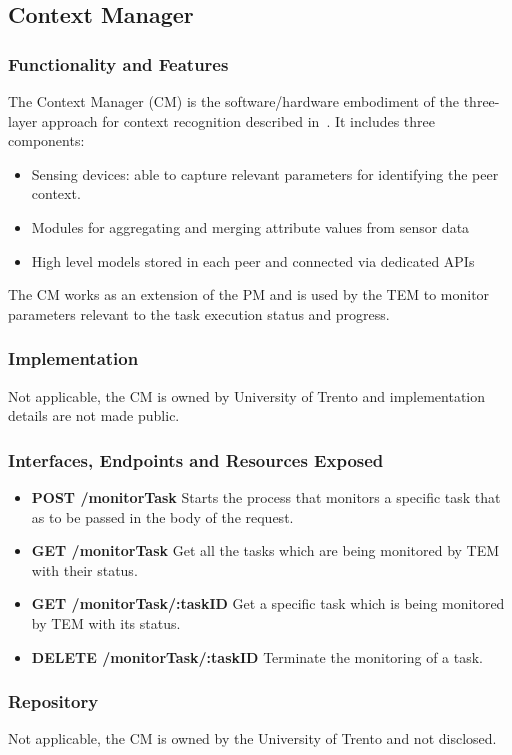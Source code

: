 \subsection{Context Manager}
\subsubsection{Functionality and Features}
The Context Manager (CM) is the software/hardware embodiment of the three-layer approach for context recognition described in~\cite{D4.3}. It includes three components:
\begin{itemize}
\item Sensing devices: able to capture relevant parameters for identifying the peer context.
\item Modules for aggregating and merging attribute values from sensor data 
\item High level models stored in each peer and connected via dedicated APIs
\end{itemize}
The CM works as an extension of the PM and is used by the TEM to monitor parameters relevant to the task execution status and progress.
\subsubsection{Implementation}
Not applicable, the CM is owned by University of Trento and implementation details are not made public.

\subsubsection{Interfaces, Endpoints and Resources Exposed}
\begin{itemize}
\item {\bf POST /monitorTask} Starts the process that monitors a specific task that as to be passed in the body of the request.
\item {\bf GET /monitorTask} Get all the tasks which are being monitored by TEM with their status.
\item {\bf GET /monitorTask/:taskID} Get a specific task which is being monitored by TEM with its status.
\item {\bf DELETE /monitorTask/:taskID} Terminate the monitoring of a task.
\end{itemize}
\subsubsection{Repository}
Not applicable, the CM is owned by the University of Trento and not disclosed. 